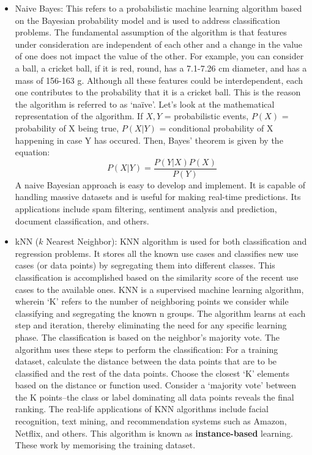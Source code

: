 \documentclass[11pt]{article}
\begin{document}
\begin{itemize}
\item Naive Bayes: This refers to a probabilistic machine learning algorithm based on the Bayesian probability model and is used to address classification problems. The fundamental assumption of the algorithm is that features under consideration are independent of each other and a change in the value of one does not impact the value of the other. For example, you can consider a ball, a cricket ball, if it is red, round, has a 7.1-7.26 cm diameter, and has a mass of 156-163 g. Although all these features could be interdependent, each one contributes to the probability that it is a cricket ball. This is the reason the algorithm is referred to as ‘naïve’. Let’s look at the mathematical representation of the algorithm.
If $X, Y$ = probabilistic events, $P(X)$ = probability of X being true, $P(X \vert Y)$ = conditional probability of X happening in case Y has occured. Then, Bayes’ theorem is given by the equation:
\begin{equation}
P(X \vert Y) = \frac{P(Y \vert X) P(X)}{P(Y)}
\end{equation}
A naive Bayesian approach is easy to develop and implement. It is capable of handling massive datasets and is useful for making real-time predictions. 
Its applications include spam filtering, sentiment analysis and prediction, document classification, and others.
\item kNN ($k$ Nearest Neighbor): KNN algorithm is used for both classification and regression problems. It stores all the known use cases and classifies new use cases (or data points) by segregating them into different classes. This classification is accomplished based on the similarity score of the recent use cases to the available ones. KNN is a supervised machine learning algorithm, wherein ‘K’ refers to the number of neighboring points we consider while classifying and segregating the known n groups. The algorithm learns at each step and iteration, thereby eliminating the need for any specific learning phase. The classification is based on the neighbor’s majority vote.
The algorithm uses these steps to perform the classification:
For a training dataset, calculate the distance between the data points that are to be classified and the rest of the data points.
Choose the closest ‘K’ elements based on the distance or function used.
Consider a ‘majority vote’ between the K points–the class or label dominating all data points reveals the final ranking. 
The real-life applications of KNN algorithms include facial recognition, text mining, and recommendation systems such as Amazon, Netflix, and others.
This algorithm is known as \textbf{instance-based} learning. These work by memorising the training dataset. 


\end{itemize}
\end{document}
